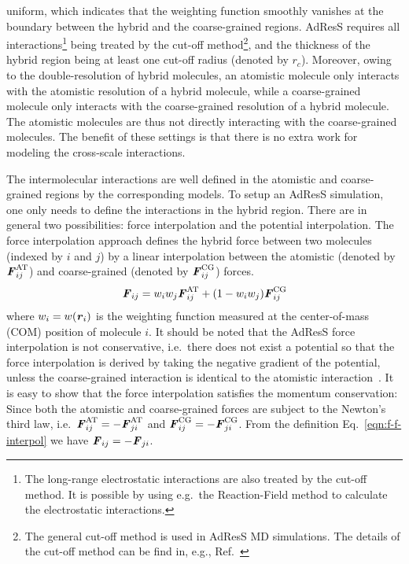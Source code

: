 \documentclass[epjST]{svjour}
\newcommand{\recheck}[1]{{\color{red} #1}}
\newcommand{\vect}[1]{\textbf{\textit{#1}}}
\newcommand{\AT}[0]{\textrm{AT}}
\newcommand{\CG}[0]{\textrm{CG}}
\newcommand{\moleidxone}[0]{i}
\newcommand{\moleidxtwo}[0]{j}
\begin{document}
uniform, which indicates that the weighting function smoothly vanishes
at the boundary between the hybrid and the coarse-grained regions.
AdResS requires 
all interactions\footnote{The long-range electrostatic interactions
  are also treated by the cut-off method. \recheck{It is possible by using e.g.~the Reaction-Field method
  to calculate the electrostatic interactions.}
} being treated
by the cut-off method\footnote{\recheck{The general cut-off method is used
    in AdResS MD simulations.  The details of the cut-off method can be find in, e.g., Ref.~\cite{frenkel2001understanding}}}, and the thickness of
the hybrid region being at least one cut-off radius (denoted by $r_c$).
Moreover, owing to the double-resolution of hybrid molecules,
an atomistic molecule only interacts with the 
atomistic resolution of a hybrid molecule,
while a coarse-grained molecule only interacts with the coarse-grained resolution
of a hybrid molecule.
The atomistic molecules are thus not directly interacting with the coarse-grained molecules.
The benefit of these settings is that
there is no extra work for modeling the cross-scale interactions.

The intermolecular interactions are
well defined in the atomistic and coarse-grained regions by the corresponding models.
To setup an AdResS simulation, one only needs to define the
interactions in the hybrid region. There are in general two
possibilities: force interpolation and the potential interpolation.
The force interpolation approach defines the hybrid force between two
molecules (indexed by $\moleidxone$ and $\moleidxtwo$) by a linear interpolation
between the atomistic (denoted by ${\vect F}_{\moleidxone\moleidxtwo}^{\AT}$) and coarse-grained (denoted by ${\vect F}_{\moleidxone\moleidxtwo}^{\CG}$) forces.
\begin{align}\label{eqn:f-f-interpol}
  {\vect F}_{\moleidxone \moleidxtwo}=w_\moleidxone w_\moleidxtwo{\vect F}_{\moleidxone\moleidxtwo}^{\AT}+(1-w_\moleidxone w_\moleidxtwo){\vect F}^{\CG}_{\moleidxone\moleidxtwo} 
\end{align}
where $w_\moleidxone = w(\vect r_\moleidxone)$ is the weighting function
measured at the center-of-mass (COM) position of molecule $\moleidxone$.
It should be noted that the AdResS  force interpolation is not conservative, i.e.~there does not
exist a potential so that the force interpolation is derived by taking the negative gradient of the potential,
unless the coarse-grained interaction is identical to the atomistic interaction~\cite{praprotnik2011comment,dellesite2007some}.
It is easy to show that the force interpolation satisfies the momentum conservation: Since
both the atomistic and coarse-grained forces are subject to the Newton's third law, i.e.~${\vect F}_{\moleidxone\moleidxtwo}^{\AT} = - {\vect F}_{\moleidxtwo\moleidxone}^{\AT}$
and ${\vect F}_{\moleidxone\moleidxtwo}^{\CG} = - {\vect F}_{\moleidxtwo\moleidxone}^{\CG}$. From the definition Eq.~\eqref{eqn:f-f-interpol} we have ${\vect F}_{\moleidxone\moleidxtwo} = - {\vect F}_{\moleidxtwo\moleidxone}$.
\end{document}

